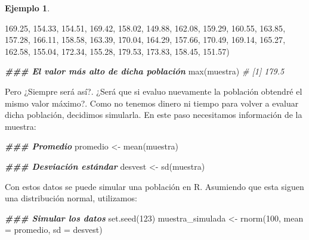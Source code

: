 \documentclass[
]{article}
\newenvironment{Shaded}{\begin{snugshade}}{\end{snugshade}}
\newcommand{\AttributeTok}[1]{\textcolor[rgb]{0.77,0.63,0.00}{#1}}
\newcommand{\CommentTok}[1]{\textcolor[rgb]{0.56,0.35,0.01}{\textit{#1}}}
\newcommand{\DecValTok}[1]{\textcolor[rgb]{0.00,0.00,0.81}{#1}}
\newcommand{\DocumentationTok}[1]{\textcolor[rgb]{0.56,0.35,0.01}{\textbf{\textit{#1}}}}
\newcommand{\FloatTok}[1]{\textcolor[rgb]{0.00,0.00,0.81}{#1}}
\newcommand{\FunctionTok}[1]{\textcolor[rgb]{0.00,0.00,0.00}{#1}}
\newcommand{\NormalTok}[1]{#1}
\newcommand{\OtherTok}[1]{\textcolor[rgb]{0.56,0.35,0.01}{#1}}
\theoremstyle{definition}
\theoremstyle{definition}
\newtheorem{example}{Ejemplo}[section]
\theoremstyle{definition}
\theoremstyle{definition}
\theoremstyle{remark}
\begin{document}
\begin{example}
\begin{Shaded}
\begin{Highlighting}[]
         \FloatTok{169.25}\NormalTok{, }\FloatTok{154.33}\NormalTok{, }\FloatTok{154.51}\NormalTok{, }\FloatTok{169.42}\NormalTok{, }\FloatTok{158.02}\NormalTok{, }\FloatTok{149.88}\NormalTok{, }\FloatTok{162.08}\NormalTok{, }\FloatTok{159.29}\NormalTok{, }
         \FloatTok{160.55}\NormalTok{, }\FloatTok{163.85}\NormalTok{, }\FloatTok{157.28}\NormalTok{, }\FloatTok{166.11}\NormalTok{, }\FloatTok{158.58}\NormalTok{, }\FloatTok{163.39}\NormalTok{, }\FloatTok{170.04}\NormalTok{, }\FloatTok{164.29}\NormalTok{, }
         \FloatTok{157.66}\NormalTok{, }\FloatTok{170.49}\NormalTok{, }\FloatTok{169.14}\NormalTok{, }\FloatTok{165.27}\NormalTok{, }\FloatTok{162.58}\NormalTok{, }\FloatTok{155.04}\NormalTok{, }\FloatTok{172.34}\NormalTok{, }\FloatTok{155.28}\NormalTok{, }
         \FloatTok{179.53}\NormalTok{, }\FloatTok{173.83}\NormalTok{, }\FloatTok{158.45}\NormalTok{, }\FloatTok{151.57}\NormalTok{)}

\DocumentationTok{\#\#\# El valor más alto de dicha población}
\FunctionTok{max}\NormalTok{(muestra)}
\CommentTok{\# [1] 179.5}
\end{Highlighting}
\end{Shaded}

Pero ¿Siempre será así?. ¿Será que si evaluo nuevamente la población obtendré el mismo valor máximo?. Como no tenemos dinero ni tiempo para volver a evaluar dicha población, decidimos simularla. En este paso necesitamos información de la muestra:

\begin{Shaded}
\begin{Highlighting}[]
\DocumentationTok{\#\#\# Promedio}
\NormalTok{promedio }\OtherTok{\textless{}{-}} \FunctionTok{mean}\NormalTok{(muestra)}

\DocumentationTok{\#\#\# Desviación estándar}
\NormalTok{desvest }\OtherTok{\textless{}{-}} \FunctionTok{sd}\NormalTok{(muestra)}
\end{Highlighting}
\end{Shaded}

Con estos datos se puede simular una población en R. Asumiendo que esta siguen una distribución normal, utilizamos:

\begin{Shaded}
\begin{Highlighting}[]
\DocumentationTok{\#\#\# Simular los datos }
\FunctionTok{set.seed}\NormalTok{(}\DecValTok{123}\NormalTok{)}
\NormalTok{muestra\_simulada }\OtherTok{\textless{}{-}} \FunctionTok{rnorm}\NormalTok{(}\DecValTok{100}\NormalTok{, }\AttributeTok{mean =}\NormalTok{ promedio, }\AttributeTok{sd =}\NormalTok{ desvest)}


\end{Highlighting}
\end{Shaded}
\end{example}
\end{document}
